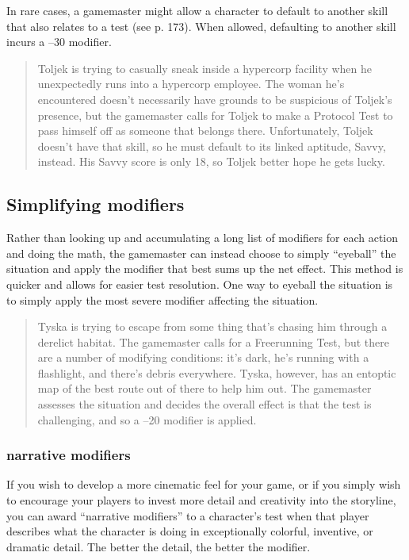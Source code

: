 In rare cases, a gamemaster might allow a character to default to
another skill that also relates to a test (see p. 173). When allowed,
defaulting to another skill incurs a –30 modifier.

\begin{quotation}
  Toljek is trying to casually sneak inside a hypercorp facility when
  he unexpectedly runs into a hypercorp employee. The woman he's
  encountered doesn't necessarily have grounds to be suspicious of
  Toljek's presence, but the gamemaster calls for Toljek to make a
  Protocol Test to pass himself off as someone that belongs
  there. Unfortunately, Toljek doesn't have that skill, so he must
  default to its linked aptitude, Savvy, instead. His Savvy score is
  only 18, so Toljek better hope he gets lucky.
\end{quotation}

\subsection{Simplifying modifiers}
\label{sec:simpl-modif}

Rather than looking up and accumulating a long list of modifiers for
each action and doing the math, the gamemaster can instead choose to
simply “eyeball” the situation and apply the modifier that best sums
up the net effect. This method is quicker and allows for easier test
resolution. One way to eyeball the situation is to simply apply the
most severe modifier affecting the situation.

\begin{quotation}
  Tyska is trying to escape from some thing that's chasing him through
  a derelict habitat. The gamemaster calls for a Freerunning Test, but
  there are a number of modifying conditions: it's dark, he's running
  with a flashlight, and there's debris everywhere. Tyska, however,
  has an entoptic map of the best route out of there to help him
  out. The gamemaster assesses the situation and decides the overall
  effect is that the test is challenging, and so a –20 modifier is
  applied.
\end{quotation}

\subsubsection{narrative modifiers}
\label{sec:narrative-modifiers}

If you wish to develop a more cinematic feel for your game, or if you
simply wish to encourage your players to invest more detail and
creativity into the storyline, you can award “narrative modifiers” to
a character's test when that player describes what the character is
doing in exceptionally colorful, inventive, or dramatic detail.  The
better the detail, the better the modifier.

